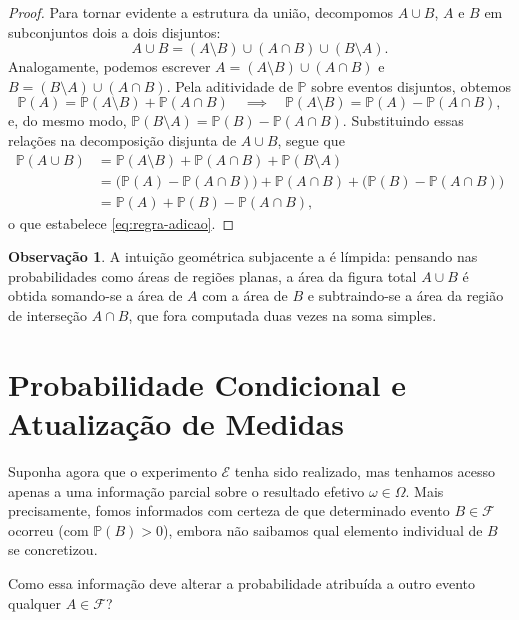 \documentclass[12pt,portuguese]{article}
\theoremstyle{definition}
\newtheorem{remark}[remark]{Observação}
\begin{document}
\begin{proof}
Para tornar evidente a estrutura da união, decompomos \(A \cup B\), \(A\) e \(B\) em subconjuntos dois a dois disjuntos:
\[
  A \cup B = (A \setminus B) \cup (A \cap B) \cup (B \setminus A).
\]
Analogamente, podemos escrever \(A = (A \setminus B) \cup (A \cap B)\) e \(B = (B \setminus A) \cup (A \cap B)\). Pela aditividade de \(\mathbb{P}\) sobre eventos disjuntos, obtemos
\[
  \mathbb{P}(A) = \mathbb{P}(A \setminus B) + \mathbb{P}(A \cap B)
  \quad\implies\quad
  \mathbb{P}(A \setminus B) = \mathbb{P}(A) - \mathbb{P}(A \cap B),
\]
e, do mesmo modo, \(\mathbb{P}(B \setminus A) = \mathbb{P}(B) - \mathbb{P}(A \cap B)\). Substituindo essas relações na decomposição disjunta de \(A \cup B\), segue que
\[
  \begin{aligned}
    \mathbb{P}(A \cup B) &= \mathbb{P}(A \setminus B) + \mathbb{P}(A \cap B) + \mathbb{P}(B \setminus A) \\
    &= \big(\mathbb{P}(A) - \mathbb{P}(A \cap B)\big) + \mathbb{P}(A \cap B) + \big(\mathbb{P}(B) - \mathbb{P}(A \cap B)\big) \\
    &= \mathbb{P}(A) + \mathbb{P}(B) - \mathbb{P}(A \cap B),
  \end{aligned}
\]
o que estabelece \eqref{eq:regra-adicao}.
\end{proof}

\begin{remark}
A intuição geométrica subjacente a  é límpida: pensando nas probabilidades como áreas de regiões planas, a área da figura total \(A \cup B\) é obtida somando-se a área de \(A\) com a área de \(B\) e subtraindo-se a área da região de interseção \(A \cap B\), que fora computada duas vezes na soma simples.
\end{remark}

\section{Probabilidade Condicional e Atualização de Medidas}
\label{sec:prob-condicional}

Suponha agora que o experimento \(\mathcal{E}\) tenha sido realizado, mas tenhamos acesso apenas a uma informação parcial sobre o resultado efetivo \(\omega \in \Omega\). Mais precisamente, fomos informados com certeza de que determinado evento \(B \in \mathcal{F}\) ocorreu (com \(\mathbb{P}(B) > 0\)), embora não saibamos qual elemento individual de \(B\) se concretizou.

Como essa informação deve alterar a probabilidade atribuída a outro evento qualquer \(A \in \mathcal{F}\)?
\end{document}
